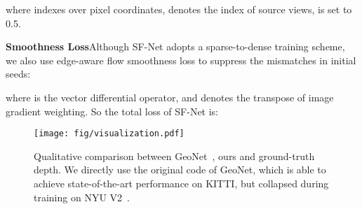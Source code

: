 \documentclass[10pt,twocolumn,letterpaper]{article}
\begin{document}
where  indexes over pixel coordinates,  denotes the index of source views,  is set to 0.5. 



\textbf{Smoothness Loss}\quad Although SF-Net adopts a sparse-to-dense training scheme, we also use edge-aware
flow smoothness loss to suppress the mismatches in initial seeds:


where  is the vector differential operator, and  denotes the transpose of image gradient weighting. So the total loss of SF-Net is:



\begin{figure*}
\begin{center}
  \texttt{[image: fig/visualization.pdf]}
\end{center}
   \vspace{-3mm}
   \caption{Qualitative comparison between GeoNet~\cite{yin2018geonet}, ours and ground-truth depth. We directly use the original code of GeoNet, which is able to achieve state-of-the-art performance on KITTI, but collapsed during training on NYU V2~\cite{silberman2012indoor}.}
   \vspace{-3mm}
\label{fig:nyu_depth}
\end{figure*}
\end{document}
